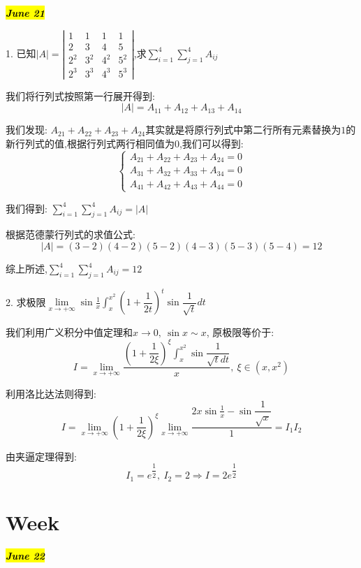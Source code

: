 \hl{\textbf{\textit{June 21}}}

1. 已知$|A|=\left|
\begin{matrix}
	1&1&1&1\\
	2&3&4&5\\
	2^2&3^2&4^2&5^2\\
	2^3&3^3&4^3&5^3
\end{matrix}
\right|$,求$\sum\limits_{i=1}^{4}\sum\limits_{j=1}^{4}A_{ij}$
\begin{solution}
	
	我们将行列式按照第一行展开得到: 
	$$|A|=A_{11}+A_{12}+A_{13}+A_{14}$$
	
	我们发现: $A_{21}+A_{22}+A_{23}+A_{24}$其实就是将原行列式中第二行所有元素替换为$1$的新行列式的值,根据行列式两行相同值为$0$,我们可以得到: 
	$$\left\lbrace
	\begin{array}{l}
		A_{21}+A_{22}+A_{23}+A_{24}=0\\
		A_{31}+A_{32}+A_{33}+A_{34}=0\\
		A_{41}+A_{42}+A_{43}+A_{44}=0
	\end{array}
	\right. $$
	
	我们得到: $\sum\limits_{i=1}^{4}\sum\limits_{j=1}^{4}A_{ij}=|A|$
	
	根据范德蒙行列式的求值公式: 
	$$|A|=(3-2)(4-2)(5-2)(4-3)(5-3)(5-4)=12$$
	
	综上所述,$\sum\limits_{i=1}^{4}\sum\limits_{j=1}^{4}A_{ij}=12$
\end{solution}

2. 求极限$\lim\limits_{x\rightarrow +\infty}\sin\frac{1}{x}\int_{x}^{x^2}(1+\dfrac{1}{2t})^{t}\sin\dfrac{1}{\sqrt{t}}dt$
\begin{solution}
	
	我们利用广义积分中值定理和$x\rightarrow 0,\ \sin x\sim x$, 原极限等价于: 
	$$I=\lim\limits_{x\rightarrow +\infty}\dfrac{(1+\dfrac{1}{2\xi})^{\xi}\int_{x}^{x^2}\sin\dfrac{1}{\sqrt{t}dt}}{x},\ \xi\in(x,x^2)$$
	
	利用洛比达法则得到: 
	$$I=\lim\limits_{x\rightarrow +\infty}(1+\dfrac{1}{2\xi})^{\xi} \lim\limits_{x\rightarrow +\infty}\dfrac{2x\sin\frac{1}{x}-\sin\dfrac{1}{\sqrt{x}}}{1}=I_{1}I_{2}$$
	
	由夹逼定理得到: 
	$$I_{1}=e^{\dfrac{1}{2}},\  I_{2}=2\Rightarrow I=2e^{\dfrac{1}{2}}$$
\end{solution}

\section{Week }
\hl{\textbf{\textit{June 22}}}

